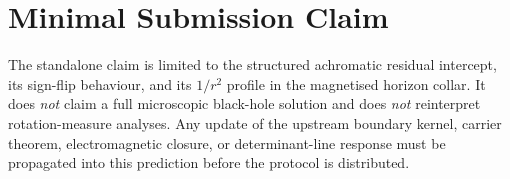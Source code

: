 \documentclass[11pt,a4paper]{article}
\begin{document}
\section{Minimal Submission Claim}
The standalone claim is limited to the structured achromatic residual intercept, its sign-flip
behaviour, and its $1/r^2$ profile in the magnetised horizon collar. It does \emph{not} claim a
full microscopic black-hole solution and does \emph{not} reinterpret rotation-measure analyses.
Any update of the upstream boundary kernel, carrier theorem, electromagnetic closure, or
determinant-line response must be propagated into this prediction before the protocol is
distributed.

\PredictionBibliography
\end{document}
